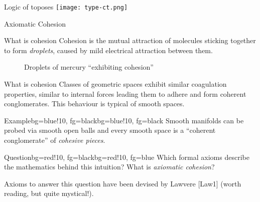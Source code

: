 \documentclass[presentation]{beamer}
\begin{document}
%
%
%
%
%
%
%
\begin{frame}[label={sec:org0dca741}]{Logic of toposes}
	\texttt{[image: type-ct.png]}
\end{frame}
%
%
%
%
%
%
%
\begin{frame}
	\Huge
	\centering
	Axiomatic Cohesion
\end{frame}
%
%
%
%
%
%
%
\begin{frame}{What is cohesion}
	Cohesion is the mutual attraction of molecules sticking together to form \emph{droplets}, caused by mild electrical attraction between them.
	\onslide<+->
	\begin{figure}[h!]
		\centering
		\caption{Droplets of mercury ``exhibiting cohesion''}
	\end{figure}
\end{frame}
%
%
%
%
%
%
%
\begin{frame}{What is cohesion}
	\onslide<+->
	Classes of geometric spaces exhibit similar coagulation properties, \onslide<+->similar to internal forces leading them to adhere and form \alert{coherent conglomerates}. \onslide<+->This behaviour is typical of \alert{smooth spaces}.

	\medskip

	\onslide<+->\begin{variableblock}{Example}{bg=blue!10, fg=black}{bg=blue!10, fg=black}
		\alert{Smooth manifolds} can be probed via smooth open balls and every smooth space is a ``coherent conglomerate'' of \emph{cohesive pieces}.
	\end{variableblock}
	\vspace*{\fill}
	\onslide<+->\begin{variableblock}{Question}{bg=red!10, fg=black}{bg=red!10, fg=blue}
		Which formal axioms describe the mathematics behind this intuition? What is \emph{axiomatic cohesion}?
	\end{variableblock}

	\vspace*{\fill}
	Axioms to answer this question have been devised by Lawvere [Law1] (worth reading, but quite mystical!).
\end{frame}
%
%
%
%
%
%
%
\end{document}
